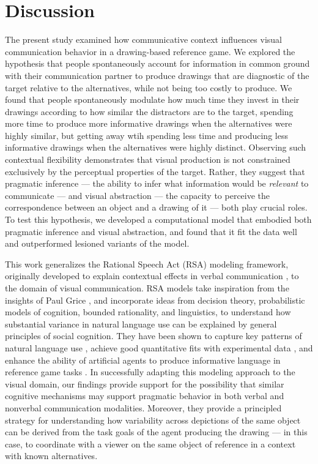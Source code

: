 \documentclass[9pt,twocolumn,twoside]{pnas-new}
\begin{document}
\section*{Discussion}

The present study examined how communicative context influences visual communication behavior in a drawing-based reference game. 
We explored the hypothesis that people spontaneously account for information in common ground with their communication partner to produce drawings that are diagnostic of the target relative to the alternatives, while not being too costly to produce. 
We found that people spontaneously modulate how much time they invest in their drawings according to how similar the distractors are to the target, spending more time to produce more informative drawings when the alternatives were highly similar, but getting away wtih spending less time and producing less informative drawings when the alternatives were highly distinct.
Observing such contextual flexibility demonstrates that visual production is not constrained exclusively by the perceptual properties of the target. 
Rather, they suggest that pragmatic inference --- the ability to infer what information would be \textit{relevant} to communicate --- and visual abstraction --- the capacity to perceive the correspondence between an object and a drawing of it --- both play crucial roles.
To test this hypothesis, we developed a computational model that embodied both pragmatic inference and visual abstraction, and found that it fit the data well and outperformed lesioned variants of the model. 

This work generalizes the Rational Speech Act (RSA) modeling framework, originally developed to explain contextual effects in verbal communication \cite{frank2012predicting,goodman2013knowledge,franke2016probabilistic,bergen2016pragmatic}, to the domain of visual communication.
RSA models take inspiration from the insights of Paul Grice \cite{grice1975syntax}, and incorporate ideas from decision theory, probabilistic models of cognition, bounded rationality, and linguistics, to understand how substantial variance in natural language use can be explained by general principles of social cognition. 
They have been shown to capture key patterns of natural language use \cite{goodman2013knowledge}, achieve good quantitative fits with experimental data \cite{kao2014formalizing}, and enhance the ability of artificial agents to produce informative language in reference game tasks \cite{monroe2017colors,Cohn-GordonGP18}.
In successfully adapting this modeling approach to the visual domain, our findings provide support for the possibility that similar cognitive mechanisms may support pragmatic behavior in both verbal and nonverbal communication modalities. 
Moreover, they provide a principled strategy for understanding how variability across depictions of the same object can be derived from the task goals of the agent producing the drawing --- in this case, to coordinate with a viewer on the same object of reference in a context with known alternatives. 
\end{document}
